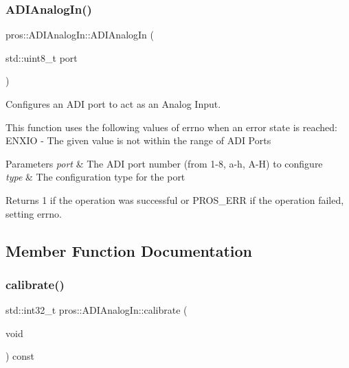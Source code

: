 \subsubsection{\texorpdfstring{A\+D\+I\+Analog\+In()}{ADIAnalogIn()}}
{\footnotesize\ttfamily pros\+::\+A\+D\+I\+Analog\+In\+::\+A\+D\+I\+Analog\+In (\begin{DoxyParamCaption}\item[{std\+::uint8\+\_\+t}]{port }\end{DoxyParamCaption})}

Configures an A\+DI port to act as an Analog Input.

This function uses the following values of errno when an error state is reached\+: E\+N\+X\+IO -\/ The given value is not within the range of A\+DI Ports


\begin{DoxyParams}{Parameters}
{\em port} & The A\+DI port number (from 1-\/8, \textquotesingle{}a\textquotesingle{}-\/\textquotesingle{}h\textquotesingle{}, \textquotesingle{}A\textquotesingle{}-\/\textquotesingle{}H\textquotesingle{}) to configure \\
\hline
{\em type} & The configuration type for the port\\
\hline
\end{DoxyParams}
\begin{DoxyReturn}{Returns}
1 if the operation was successful or P\+R\+O\+S\+\_\+\+E\+RR if the operation failed, setting errno. 
\end{DoxyReturn}


\subsection{Member Function Documentation}
\mbox{\label{classpros_1_1ADIAnalogIn_ac8dd1e625cbcec4951d20be0c0fa2d3c}} 
\subsubsection{\texorpdfstring{calibrate()}{calibrate()}}
{\footnotesize\ttfamily std\+::int32\+\_\+t pros\+::\+A\+D\+I\+Analog\+In\+::calibrate (\begin{DoxyParamCaption}\item[{void}]{ }\end{DoxyParamCaption}) const}

